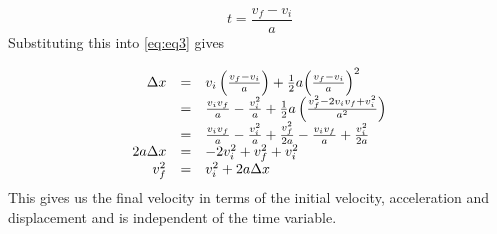     \begin{equation}
    t=\frac{{v}_{f}-{v}_{i}}{a}
      \end{equation}
          \label{m38796*id77132}Substituting this into  \ref{eq:eq3} gives\par 
          \label{m38796*uid139}\nopagebreak\noindent{}
            
    \begin{equation}
    \begin{array}{ccc}\hfill \Delta x& =& {v}_{i}\left(\frac{{v}_{f}-{v}_{i}}{a}\right)+\frac{1}{2}a{\left(\frac{{v}_{f}-{v}_{i}}{a}\right)}^{2}\hfill \\ & =& \frac{{v}_{i}{v}_{f}}{a}-\frac{v_{i}^{2}}{a}+\frac{1}{2}a\left(\frac{v_{f}^{2}-2{v}_{i}{v}_{f}+v_{i}^{2}}{{a}^{2}}\right)\hfill \\ & =& \frac{{v}_{i}{v}_{f}}{a}-\frac{v_{i}^{2}}{a}+\frac{v_{f}^{2}}{2a}-\frac{{v}_{i}{v}_{f}}{a}+\frac{v_{i}^{2}}{2a}\hfill \\ \hfill 2a\Delta x& =& -2v_{i}^{2}+v_{f}^{2}+v_{i}^{2}\hfill \\ \hfill v_{f}^{2}& =& v_{i}^{2}+2a\Delta x\hfill \end{array}
      \end{equation}
          \label{m38796*id77586}This gives us the final velocity in terms of the initial velocity, acceleration and displacement and is independent of the time variable.\par 
\label{m38796*secfhsst!!!underscore!!!id4852}\vspace{.5cm} 
      \noindent
